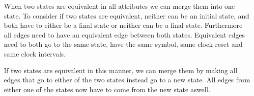 When two states are equivalent in all attributes we can merge them into one state.
To consider if two states are equivalent, neither can be an initial state, and both have to either be a final state or neither can be a final state.
Furthermore all edges need to have an equivalent edge between both states.
Equivalent edges need to both go to the same state, have the same symbol, same clock reset and same clock intervals.

If two states are equivalent in this manner, we can merge them by making all edges that go to either of the two states instead go to a new state.
All edges from either one of the states now have to come from the new state aswell.

